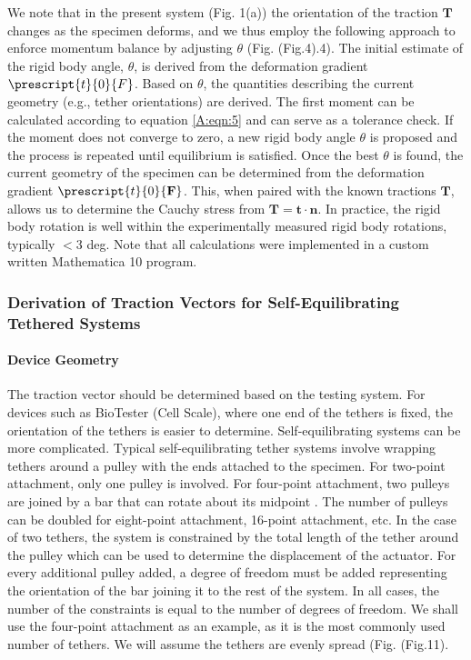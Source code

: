     
    We note that in the present system (Fig. 1(a)) the orientation of the traction $\mathbf{T}$ changes as the specimen deforms, and we thus employ the following approach to enforce momentum balance by adjusting $\theta$ (Fig. (Fig.4).4). The initial estimate of the rigid body angle, $\theta$, is derived from the deformation gradient $\prescript{t}{0}{F}$. Based on $\theta$, the quantities describing the current geometry (e.g., tether orientations) are derived. The first moment can be calculated according to equation \ref{A:eqn:5} and can serve as a tolerance check. If the moment does not converge to zero, a new rigid body angle $\theta$ is proposed and the process is repeated until equilibrium is satisfied. Once the best $\theta$ is found, the current geometry of the specimen can be determined from the deformation gradient $\prescript{t}{0}{\mathbf{F}}$. This, when paired with the known tractions $\mathbf{T}$, allows us to determine the Cauchy stress from $\mathbf{T} = \mathbf{t}\cdot\mathbf{n}$. In practice, the rigid body rotation is well within the experimentally measured rigid body rotations, typically $<3$ deg. Note that all calculations were implemented in a custom written Mathematica 10 program.
    
    
\subsubsection{Derivation of Traction Vectors for Self-Equilibrating Tethered Systems}

    \paragraph{Device Geometry} The traction vector should be determined based on the testing system. For devices such as BioTester (Cell Scale), where one end of the tethers is fixed, the orientation of the tethers is easier to determine. Self-equilibrating systems can be more complicated. Typical self-equilibrating tether systems involve wrapping tethers around a pulley with the ends attached to the specimen. For two-point attachment, only one pulley is involved. For four-point attachment, two pulleys are joined by a bar that can rotate about its midpoint \cite{sacks_biaxial_2000}. The number of pulleys can be doubled for eight-point attachment, 16-point attachment, etc. In the case of two tethers, the system is constrained by the total length of the tether around the pulley which can be used to determine the displacement of the actuator. For every additional pulley added, a degree of freedom must be added representing the orientation of the bar joining it to the rest of the system. In all cases, the number of the constraints is equal to the number of degrees of freedom. We shall use the four-point attachment as an example, as it is the most commonly used number of tethers. We will assume the tethers are evenly spread (Fig. (Fig.11).
    
